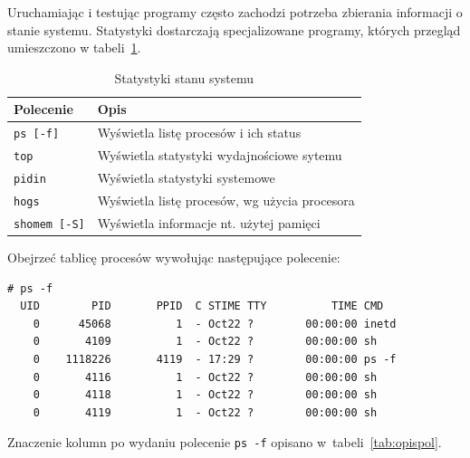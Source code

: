 \begin{example}

Uruchamiając i testując programy często zachodzi potrzeba zbierania informacji o stanie systemu. Statystyki dostarczają specjalizowane programy, których przegląd umieszczono w tabeli~\ref{tab:statystyki}.

\begin{table}[h!]
\centering
\caption{Statystyki stanu systemu}
\setlength{\arrayrulewidth}{1pt}
\setlength{\tabcolsep}{6pt}
\renewcommand{\arraystretch}{1.2}
\begin{tabular}{ |p{}|p{}|}
\hline \rowcolor{gray}
\textbf{Polecenie} & \textbf{Opis} \\ \hline
\mbox{\lstinline[style=MyBashStyle]{ps [-f]}} & Wyświetla listę procesów i ich status \\ \hline
\mbox{\lstinline[style=MyBashStyle]{top}} & Wyświetla statystyki wydajnościowe sytemu \\ \hline
\mbox{\lstinline[style=MyBashStyle]{pidin}}  & Wyświetla statystyki systemowe \\ \hline
\mbox{\lstinline[style=MyBashStyle]{hogs}}  & Wyświetla listę procesów, wg użycia procesora \\ \hline
\mbox{\lstinline[style=MyBashStyle]{shomem [-S]}}  & Wyświetla informacje nt. użytej pamięci \\ \hline
\end{tabular}
\label{tab:statystyki}
\end{table}

Obejrzeć tablicę procesów wywołując następujące polecenie:
\begin{lstlisting}[style=MyBashStyle,deletekeywords={ps}]
# ps -f
  UID        PID       PPID  C STIME TTY          TIME CMD
    0      45068          1  - Oct22 ?        00:00:00 inetd
    0       4109          1  - Oct22 ?        00:00:00 sh
    0    1118226       4119  - 17:29 ?        00:00:00 ps -f
    0       4116          1  - Oct22 ?        00:00:00 sh
    0       4118          1  - Oct22 ?        00:00:00 sh
    0       4119          1  - Oct22 ?        00:00:00 sh
\end{lstlisting}

Znaczenie kolumn po wydaniu polecenie \lstinline[style=MyBashStyle]{ps -f} opisano w~tabeli~\ref{tab:opispol}.


\end{example}
